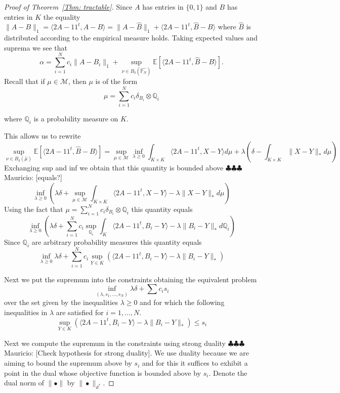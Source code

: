 \documentclass[12pt]{amsart}
\theoremstyle{remark}
\newcommand{\EE}{\mathbb{E}}
\newcommand{\mv}[1]{{\color{red} \sf $\clubsuit\clubsuit\clubsuit$ Mauricio: [#1]}}
\begin{document}
\begin{proof}[Proof of Theorem~\ref{Thm: tractable}]
Since $A$ has entries in $\{0,1\}$ and $B$ has entries in $K$ the equality $\|A-B\|_1=\langle 2A-11^t, A-B\rangle=\|A-\hat{B}\|_1+\langle 2A-11^t, \hat{B}-B\rangle$  where $\hat{B}$ is distributed according to the empirical measure holds. Taking expected values and suprema we see that
\[\alpha=\sum_{i=1}^N c_i\|A-B_i\|_1+\sup_{\nu\in B_{\delta}(\hat{\mathbb{P}_N})}\EE\left[\langle 2A-11^t, \hat{B}-B\rangle\right].\] 
Recall that if $\mu \in \mathcal{M}$, then $\mu$ is of the form 
\[\mu = \sum_{i=1}^N c_i \delta_{B_i}\otimes \mathbb{Q}_i\]

where $\mathbb{Q}_i$ is a probability measure on $K$.

This allows us to rewrite
\[\sup_{\nu\in B_{\delta}(\hat{\mu})}\EE\left[\langle 2A-11^t, \hat{B}-B\rangle\right] = 
\sup_{\mu\in \mathcal{M}} \inf_{\lambda\geq 0} \int_{K\times K}\langle 2A-11^t, X-Y\rangle d\mu +\lambda\left(\delta -\int_{K\times K} \|X-Y\|_*d\mu\right)\]
Exchanging sup and inf we obtain that this quantity is bounded above \mv{equals?}
\[\inf_{\lambda\geq 0} \left(\lambda \delta +\sup_{\mu\in \mathcal{M}}\int_{K\times K} \langle 2A-11^t, X-Y\rangle -\lambda \|X-Y\|_*d\mu\right)\]
Using the fact that $\mu = \sum_{i=1}^N c_i \delta_{B_i}\otimes \mathbb{Q}_i$ this quantity equals
                                                                                                                                                                                                                                                                               \[\inf_{\lambda\geq 0} \left(\lambda\delta + \sum_{i=1}^N c_i \sup_{\mathbb{Q}_i} \int_{K} \langle 2A-11^t, B_i-Y\rangle -\lambda \|B_i-Y\|_*d\mathbb{Q}_i\right)\]
Since $\mathbb{Q}_i$ are arbitrary probability measures this quantity equals
\[\inf_{\lambda\geq 0} \lambda \delta +\sum_{i=1}^N c_i \sup_{Y\in K} \left(\langle 2A-11^t, B_i-Y\rangle -\lambda \|B_i-Y\|_*\right)\]

Next we put the supremum into the constraints obtaining the equivalent problem
\[ \inf_{(\lambda,s_1,\dots, s_N)} \lambda\delta +\sum c_is_i\]
over the set given by the inequalities $\lambda\geq 0$ and for which the following inequalities in $\lambda$ are satisfied for $i=1,\dots, N$.
\[\sup_{Y\in K} \left(\langle 2A-11^t, B_i-Y\rangle -\lambda \|B_i-Y\|_*\right)\leq s_i\]


Next we compute the supremum in the constraints using strong duality \mv{Check hypothesis for strong duality}. We use duality because we are aiming to bound  the supremum above by $s_i$ and for this it suffices to exhibit a point in the dual whose objective function is bounded above by $s_i$. Denote the dual norm of $\|\bullet\|$ by $\|\bullet\|_{d^*}$.




\end{proof}
\end{document}
